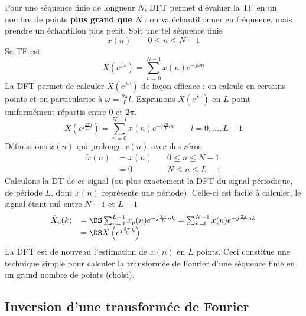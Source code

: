 	Pour une séquence finie de longueur $N$, DFT permet d'évaluer la TF en un nombre de  points 
	\textbf{plus grand que $N$} : on va échantillonner en fréquence, mais prendre un échantillon 
	plus petit. Soit une tel séquence finie
	\begin{equation}
	x(n) \qquad 0\leq n \leq N-1
	\end{equation}
	Sa TF est 
	\begin{equation}
	X(e^{j\omega}) = \sum_{n=0}^{N-1} x(n)e^{-j\omega n}
	\end{equation}
	La DFT permet de calculer $X(e^{j\omega})$ de façon efficace : on calcule en certains points 
	et on particularise à $\omega=\frac{2\pi}{L}l$. Exprimons $X(e^{j\omega})$ en $L$ point uniformément 
	répartis entre 0 et $2\pi$.
	\begin{equation}
	X\left(e^{j\frac{2\pi}{L}l}\right) = \sum_{n=0}^{N-1}x(n)e^{-j\frac{2\pi}{L}ln}\qquad l=0,\dots,L-1
	\end{equation}
	Définissions $\tilde{x}(n)$ qui prolonge $x(n)$ avec des zéros
	\begin{equation}
	\begin{array}{lll}
	\tilde{x}(n) &= x(n) &\quad 0\leq n\leq N-1\\
	&=0&\quad N\leq n\leq L-1
	\end{array}
	\end{equation}
	Calculons la DT de ce signal (ou plus exactement la DFT du signal périodique, de période $L$,
	dont $x(n)$ représente une période). Celle-ci est facile à calculer, le signal étant nul entre 
	$N-1$ et $L-1$
	\begin{equation}
	\begin{array}{ll}
	\tilde{X}_p(k) &=\DS \sum_{n=0}^{L-1} \tilde{x_p}(n)e^{-j\frac{2\pi}{L}nk} = \sum_{n=0}^{N-1} 
	x(n)e^{-j\frac{2\pi}{L}nk}\\
	&=\DS X\left(e^{j\frac{2\pi}{L}k}\right)
	\end{array}
	\end{equation}
	La DFT est de nouveau l'estimation de $x(n)$ en $L$ points. Ceci constitue une technique simple pour 
	calculer la transformée de Fourier d'une séquence finie en un grand nombre de points (choisi).
	
	
	\subsection{Inversion d'une transformée de Fourier}
